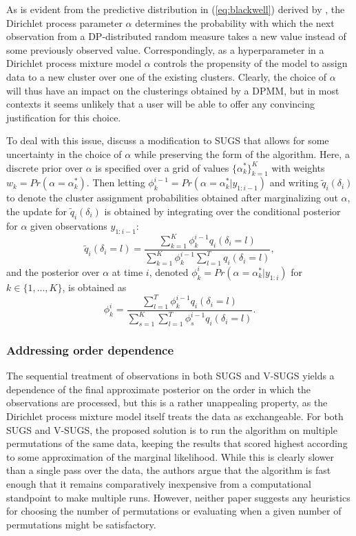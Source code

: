 \documentclass{uwstat572}
\begin{document}
As is evident from the predictive distribution in (\ref{eq:blackwell}) derived by \cite{blackwell}, the Dirichlet process parameter $\alpha$ determines the probability with which the next observation from a DP-distributed random measure takes a new value instead of some previously observed value. Correspondingly, as a hyperparameter in a Dirichlet process mixture model $\alpha$ controls the propensity of the model to assign data to a new cluster over one of the existing clusters. Clearly, the choice of $\alpha$ will thus have an impact on the clusterings obtained by a DPMM, but in most contexts it seems unlikely that a user will be able to offer any convincing justification for this choice. 

To deal with this issue, \cite{wang} discuss a modification to SUGS that allows for some uncertainty in the choice of $\alpha$ while preserving the form of the algorithm. Here, a discrete prior over $\alpha$ is specified over a grid of values $\{\alpha^*_k\}_{k=1}^K$ with weights $w_k = Pr(\alpha = \alpha_k^*)$. Then letting $\phi_k^{i-1} = Pr(\alpha = \alpha_k^* | y_{1:i-1})$ and writing $\tilde{q}_i(\delta_i)$ to denote the cluster assignment probabilities obtained after marginalizing out $\alpha$, the update for $\tilde{q}_i(\delta_i)$ is obtained by integrating over the conditional posterior for $\alpha$ given observations $y_{1:i-1}$:
$$ \tilde{q}_i(\delta_i = l) = \frac{\sum_{k=1}^K \phi_k^{i-1} q_i(\delta_i = l)}{\sum_{k=1}^K \phi_k^{i-1} \sum_{l=1}^T q_i(\delta_i = l)}, $$
and the posterior over $\alpha$ at time $i$, denoted $\phi_k^{i} = Pr(\alpha = \alpha_k^* | y_{1:i})$ for $k \in \{1,...,K\}$, is obtained as 
$$ \phi_k^{i} = \frac{\sum_{l=1}^T \phi_k^{i-1} q_i(\delta_i = l)}{\sum_{s=1}^K \sum_{l=1}^T \phi_s^{i-1} q_i(\delta_i = l)}.$$

\subsubsection{Addressing order dependence}

The sequential treatment of observations in both SUGS and V-SUGS yields a dependence of the final approximate posterior on the order in which the observations are processed, but this is a rather unappealing property, as the Dirichlet process mixture model itself treats the data as exchangeable. For both SUGS and V-SUGS, the proposed solution is to run the algorithm on multiple permutations of the same data, keeping the results that scored highest according to some approximation of the marginal likelihood. While this is clearly slower than a single pass over the data, the authors argue that the algorithm is fast enough that it remains comparatively inexpensive from a computational standpoint to make multiple runs. However, neither paper suggests any heuristics for choosing the number of permutations or evaluating when a given number of permutations might be satisfactory.
\end{document}
